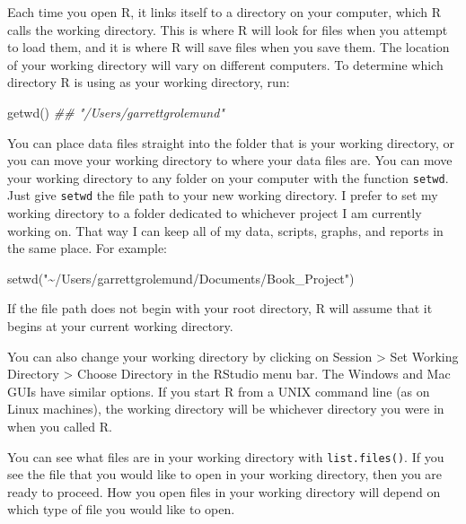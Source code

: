 \documentclass[
  letterpaper,
  DIV=11,
  numbers=noendperiod]{scrbook}
\newenvironment{Shaded}{\begin{snugshade}}{\end{snugshade}}
\newcommand{\DocumentationTok}[1]{\textcolor[rgb]{0.37,0.37,0.37}{\textit{#1}}}
\newcommand{\FunctionTok}[1]{\textcolor[rgb]{0.28,0.35,0.67}{#1}}
\newcommand{\NormalTok}[1]{\textcolor[rgb]{0.00,0.23,0.31}{#1}}
\newcommand{\StringTok}[1]{\textcolor[rgb]{0.13,0.47,0.30}{#1}}
\begin{document}
Each time you open R, it links itself to a directory on your computer,
which R calls the working directory. This is where R will look for files
when you attempt to load them, and it is where R will save files when
you save them. The location of your working directory will vary on
different computers. To determine which directory R is using as your
working directory, run:

\begin{Shaded}
\begin{Highlighting}[]
\FunctionTok{getwd}\NormalTok{()}
\DocumentationTok{\#\# "/Users/garrettgrolemund"}
\end{Highlighting}
\end{Shaded}

You can place data files straight into the folder that is your working
directory, or you can move your working directory to where your data
files are. You can move your working directory to any folder on your
computer with the function \texttt{setwd}. Just give \texttt{setwd} the
file path to your new working directory. I prefer to set my working
directory to a folder dedicated to whichever project I am currently
working on. That way I can keep all of my data, scripts, graphs, and
reports in the same place. For example:

\begin{Shaded}
\begin{Highlighting}[]
\FunctionTok{setwd}\NormalTok{(}\StringTok{"\textasciitilde{}/Users/garrettgrolemund/Documents/Book\_Project"}\NormalTok{)}
\end{Highlighting}
\end{Shaded}

If the file path does not begin with your root directory, R will assume
that it begins at your current working directory.

You can also change your working directory by clicking on Session
\textgreater{} Set Working Directory \textgreater{} Choose Directory in
the RStudio menu bar. The Windows and Mac GUIs have similar options. If
you start R from a UNIX command line (as on Linux machines), the working
directory will be whichever directory you were in when you called R.

You can see what files are in your working directory with
\texttt{list.files()}. If you see the file that you would like to open
in your working directory, then you are ready to proceed. How you open
files in your working directory will depend on which type of file you
would like to open.
\end{document}
